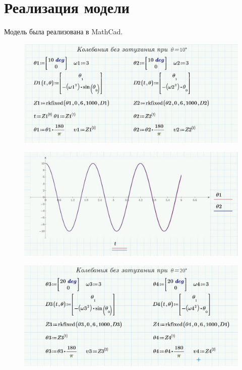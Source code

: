 \documentclass[a4paper, 14pt]{extarticle}
\begin{document}
	\section{Реализация модели}
		Модель была реализована в MathCad.		
		\begin{figure}[H]
			\centering
			\includegraphics[width = \linewidth]{1.jpg}
		\end{figure}
		\begin{figure}[H]
			\centering
			\includegraphics[width = \linewidth]{2.jpg}
		\end{figure}
		\begin{figure}[H]
			\centering
			\includegraphics[width = \linewidth]{3.jpg}
		\end{figure}
\end{document}
